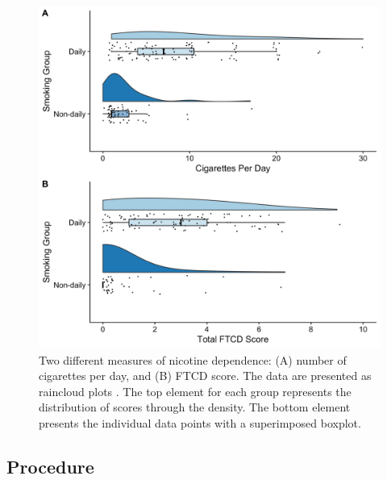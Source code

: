 \documentclass[empirical, authordate, issue]{jote-new-article}
\begin{document}
\begin{figure}[t]

  \begin{fullwidth}
    \includegraphics[width=\linewidth]{media/image2.jpeg}
    \caption{
      Two different measures of nicotine dependence: (A) number of cigarettes per day, and (B) FTCD score. The data are presented as raincloud plots \parencite{Allen2019}. The top element for each group represents the distribution of scores through the density. The bottom element presents the individual data points with a superimposed boxplot.
    }
    \label{fig:2}

  \end{fullwidth}

\end{figure}

\subsection{Procedure}
\end{document}
